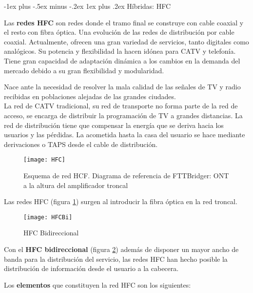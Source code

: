 \documentclass[10pt,portrait, twocolumn]{article}
\makeatletter
\renewcommand{\subsubsection}{\@startsection{subsubsection}{3}{0mm}%
                                {-1ex plus -.5ex minus -.2ex}%
                                {1ex plus .2ex}%
                                {\normalfont\small\bfseries}}
\makeatother
\begin{document}
\subsubsection{Híbridas: HFC}

Las \textbf{redes HFC} son redes donde el tramo final se construye con cable coaxial y el resto con fibra óptica. Una evolución de las redes de distribución por cable coaxial. Actualmente, ofrecen una gran variedad de servicios, tanto digitales como analógicos. Su potencia y flexibilidad la hacen idónea para CATV y telefonía. Tiene gran capacidad de adaptación dinámica a los cambios en la demanda del mercado debido a su gran flexibilidad y modularidad.

\quad Nace ante la necesidad de resolver la mala calidad de las señales de TV y radio recibidas en poblaciones alejadas de las grandes ciudades.\\

La red de CATV tradicional, su red de transporte no forma parte de la red de acceso, se encarga de distribuir la programación de TV a grandes distancias. La red de distribución tiene que compensar la energía que se deriva hacia los usuarios y las pérdidas. La acometida hasta la casa del usuario se hace mediante derivaciones o TAPS desde el cable de distribución.

\begin{figure}[!ht]	
	\centering
    	\texttt{[image: HFC]}
	\caption{Esquema de red HCF. Diagrama de referencia de FTTBridger: ONT a la altura del amplificador troncal}
	\label{fig:HFC}
\end{figure}    

Las redes HFC (figura \ref{fig:HFC}) surgen al introducir la fibra óptica en la red troncal. 

\begin{figure}[!ht]	
	\centering
    	\texttt{[image: HFCBi]}
	\caption{HFC Bidireccional}
	\label{fig:HFCBi}
\end{figure}    

Con el \textbf{HFC bidireccional} (figura \ref{fig:HFCBi}) además de disponer un mayor ancho de banda para la distribución del servicio, las redes HFC han hecho posible la distribución de información desde el usuario a la cabecera.

\quad Los \textbf{elementos} que constituyen la red HFC son los siguientes:
\end{document}
